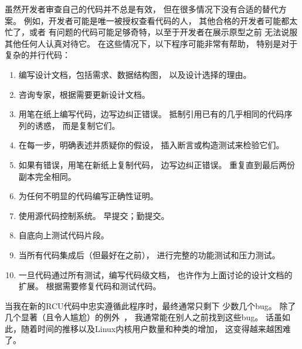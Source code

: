 虽然开发者审查自己的代码并不总是有效，
但在很多情况下没有合适的替代方案。
例如，开发者可能是唯一被授权查看代码的人，
其他合格的开发者可能都太忙了，或者
有问题的代码可能足够奇特，以至于开发者在展示原型之前
无法说服其他任何人认真对待它。
在这些情况下，以下程序可能非常有帮助，
特别是对于复杂的并行代码：

\begin{enumerate}
\item	编写设计文档，包括需求、数据结构图，
	以及设计选择的理由。
\item	咨询专家，根据需要更新设计文档。
\item	用笔在纸上编写代码，边写边纠正错误。
	抵制引用已有的几乎相同的代码序列的诱惑，
	而是复制它们。
\item	在每一步，明确表述并质疑你的假设，
	插入断言或构造测试来检验它们。
\item	如果有错误，用笔在新纸上复制代码，
	边写边纠正错误。
	重复直到最后两份副本完全相同。
\item	为任何不明显的代码编写正确性证明。
\item	使用源代码控制系统。
	早提交；勤提交。
\item	自底向上测试代码片段。
\item	当所有代码集成后（但最好在之前），
	进行完整的功能测试和压力测试。
\item	一旦代码通过所有测试，编写代码级文档，
	也许作为上面讨论的设计文档的扩展。
	根据需要修复代码和测试代码。
\end{enumerate}

当我在新的RCU代码中忠实遵循此程序时，最终通常只剩下
少数几个bug。
除了几个显著（且令人尴尬）的例外~\cite{PaulEMcKenney2011RCU3.0trainwreck}，
我通常能在别人之前找到这些bug。
话虽如此，随着时间的推移以及Linux内核用户数量和种类的增加，
这变得越来越困难了。

